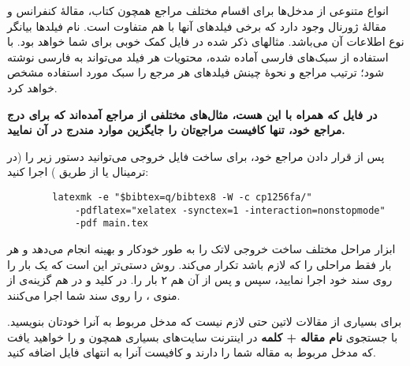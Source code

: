 انواع متنوعی از مدخل‌ها برای اقسام مختلف مراجع همچون کتاب، مقالهٔ کنفرانس و مقالهٔ ژورنال وجود دارد که برخی فیلدهای آنها با هم متفاوت است. 
نام فیلدها بیانگر نوع اطلاعات آن می‌باشد. مثالهای ذکر شده در فایل  کمک خوبی برای شما خواهد بود. 
با استفاده از سبک‌های فارسی آماده شده، محتویات هر فیلد می‌تواند به فارسی نوشته شود؛ ترتیب مراجع و نحوهٔ چینش فیلدهای هر مرجع را سبک مورد استفاده  مشخص خواهد کرد.

\textbf{در فایل 
 که همراه با این \پ هست، مثال‌های مختلفی از مراجع آمده‌اند که برای درج مراجع خود، تنها کافیست مراجع‌تان را جایگزین موارد مندرج در آن نمایید.
}

پس از قرار دادن مراجع خود، برای ساخت فایل خروجی می‌توانید دستور زیر را (در ترمینال یا از طریق ) اجرا کنید:

\singlespacing
\begin{LTR}
	\begin{verbatim}
		latexmk -e "$bibtex=q/bibtex8 -W -c cp1256fa/"
	        -pdflatex="xelatex -synctex=1 -interaction=nonstopmode"
	        -pdf main.tex
	\end{verbatim}
\end{LTR}
\doublespacing
ابزار  مراحل مختلف ساخت خروجی لاتک را به طور خودکار و بهینه انجام می‌دهد و هر بار فقط مراحلی را که لازم باشد تکرار می‌کند.
روش دستی‌تر این است که یک بار  را روی سند خود اجرا نمایید، سپس  و پس از آن هم ۲ بار  را. در  کلید  و در  هم گزینه‌ی  از منوی ،  را روی سند شما اجرا می‌کنند.

برای بسیاری از مقالات لاتین حتی لازم نیست که مدخل مربوط به آنرا خودتان بنویسید. با جستجوی 
\textbf{نام مقاله + کلمه
}
در اینترنت سایت‌های بسیاری همچون  و  را خواهید یافت که مدخل  مربوط به مقاله شما را دارند و کافیست آنرا به انتهای فایل  اضافه کنید.
